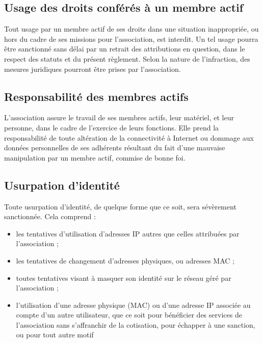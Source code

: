 \documentclass[12pt]{article}
\begin{document}
    \subsection{Usage des droits conférés à un membre actif}

		Tout usage par un membre actif de ses droits dans une situation inappropriée, ou hors du cadre de ses missions pour l’association, est interdit. Un tel usage pourra être sanctionné sans délai par un retrait des attributions en question, dans le respect des statuts et du présent règlement. Selon la nature de l’infraction, des mesures juridiques pourront être prises par l’association.

    \subsection{Responsabilité des membres actifs}

		L’association assure le travail de ses membres actifs, leur matériel, et leur personne, dans le cadre de l’exercice de leurs fonctions. Elle prend la responsabilité de toute altération de la connectivité à Internet ou dommage aux données personnelles de ses adhérents résultant du fait d’une mauvaise manipulation par un membre actif, commise de bonne foi.

    \subsection{Usurpation d'identité}

		Toute usurpation d'identité, de quelque forme que ce soit, sera sévèrement sanctionnée. Cela comprend :

		\begin{itemize}
		    \item[\textbullet] les tentatives d'utilisation d'adresses IP autres que celles attribuées par l'association ;

		    \item[\textbullet] les tentatives de changement d'adresses physiques, ou adresses MAC ;

		    \item[\textbullet] toutes tentatives visant à masquer son identité sur le réseau géré par l'association ;

		    \item[\textbullet] l'utilisation d'une adresse physique (MAC) ou d'une adresse IP associée au compte d'un autre utilisateur, que ce soit pour bénéficier des services de l'association sans s'affranchir de la cotisation, pour échapper à une sanction, ou pour tout autre motif 
		\end{itemize}
\end{document}
